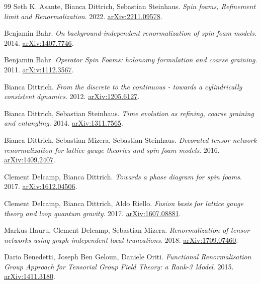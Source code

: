 \documentclass[11pt,letterpaper]{report}
\begin{document}
\begin{thebibliography}{99}
Seth K. Asante, Bianca Dittrich, Sebastian Steinhaus. \emph{Spin foams, Refinement limit and Renormalization}. 2022. \href{https://arxiv.org/abs/2211.09578v1}{arXiv:2211.09578}.

Benjamin Bahr. \emph{On background-independent renormalization of spin foam models}. 2014. \href{https://arxiv.org/abs/1407.7746v2}{arXiv:1407.7746}.

Benjamin Bahr. \emph{Operator Spin Foams: holonomy formulation and coarse graining}. 2011. \href{https://arxiv.org/abs/1112.3567v1}{arXiv:1112.3567}.

Bianca Dittrich. \emph{From the discrete to the continuous - towards a cylindrically consistent dynamics}. 2012. \href{https://arxiv.org/abs/1205.6127v1}{arXiv:1205.6127}.

Bianca Dittrich, Sebastian Steinhaus. \emph{Time evolution as refining, coarse graining and entangling}. 2014. \href{https://arxiv.org/abs/1311.7565v4}{arXiv:1311.7565}.

Bianca Dittrich, Sebastian Mizera, Sebastian Steinhaus. \emph{Decorated tensor network renormalization for lattice gauge theories and spin foam models}. 2016. \href{https://arxiv.org/abs/1409.2407v2}{arXiv:1409.2407}.

Clement Delcamp, Bianca Dittrich. \emph{Towards a phase diagram for spin foams}. 2017. \href{https://arxiv.org/abs/1612.04506v1}{arXiv:1612.04506}.

Clement Delcamp, Bianca Dittrich, Aldo Riello. \emph{Fusion basis for lattice gauge theory and loop quantum gravity}. 2017. \href{https://arxiv.org/abs/1607.08881v2}{arXiv:1607.08881}.

Markus Hauru, Clement Delcamp, Sebastian Mizera. \emph{Renormalization of tensor networks using graph independent local truncations}. 2018. \href{https://arxiv.org/abs/1709.07460v2}{arXiv:1709.07460}.

Dario Benedetti, Joseph Ben Geloun, Daniele Oriti. \emph{Functional Renormalisation Group Approach for Tensorial Group Field Theory: a Rank-3 Model}. 2015. \href{https://arxiv.org/abs/1411.3180v2}{arXiv:1411.3180}.
\end{thebibliography}
\end{document}
